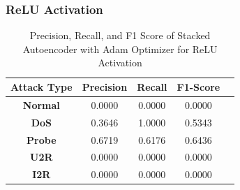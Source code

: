 \documentclass[12pt, a4paper]{report}
\begin{document}
\subsubsection{ReLU Activation}
\begin{table}[ht]
\centering
\captionsetup{justification=centering,margin=2cm}
\begin{tabular}{|c|c|c|c|c|}
\hline
\multicolumn{1}{|c|}{\textbf{Attack Type}} & \multicolumn{1}{c|}{\textbf{Precision}} & \multicolumn{1}{c|}{\textbf{Recall}} & \multicolumn{1}{c|}{\textbf{F1-Score}} \\ \hline
\textbf{Normal}        & 0.0000                                   & 0.0000                                & 0.0000                                                                   \\ \hline
\textbf{DoS}           & 0.3646                                  & 1.0000                                &  0.5343                                                                    \\ \hline
\textbf{Probe}         & 0.6719                                  & 0.6176                                & 0.6436                                                                  \\ \hline
\textbf{U2R}           & 0.0000                                    & 0.0000                                & 0.0000                                                                   \\ \hline
\textbf{I2R}           & 0.0000                                      & 0.0000                                   & 0.0000                                                            \\ \hline         \end{tabular}
\caption{Precision, Recall, and F1 Score of Stacked Autoencoder with Adam Optimizer for ReLU Activation}
\label{prf1_adam_relu_auto}
\end{table}
\clearpage
\end{document}
